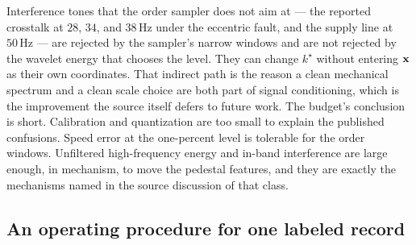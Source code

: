 Interference tones that the order sampler does not aim at --- the reported crosstalk at \(28\), \(34\), and \(38\,\mathrm{Hz}\) under the eccentric fault, and the supply line at \(50\,\mathrm{Hz}\) --- are rejected by the sampler's narrow windows and are not rejected by the wavelet energy that chooses the level.
They can change \(k^{\star}\) without entering \(\mathbf{x}\) as their own coordinates.
That indirect path is the reason a clean mechanical spectrum and a clean scale choice are both part of signal conditioning, which is the improvement the source itself defers to future work.
The budget's conclusion is short.
Calibration and quantization are too small to explain the published confusions.
Speed error at the one-percent level is tolerable for the order windows.
Unfiltered high-frequency energy and in-band interference are large enough, in mechanism, to move the pedestal features, and they are exactly the mechanisms named in the source discussion of that class.

\subsection{An operating procedure for one labeled record}
\label{sec:procedure}

